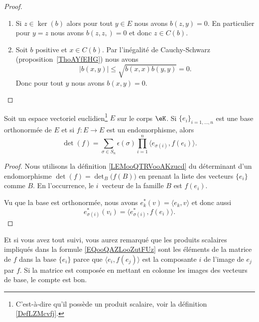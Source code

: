 \begin{proof}
    \begin{enumerate}
        \item
            Si \( z\in\ker(b)\) alors pour tout \( y\in E\) nous avons \( b(z,y)=0\). En particulier pour \( y=z\) nous avons \( b(z,z,)=0\) et donc \( z\in C(b)\).
        \item
            Soit \( b\) positive et \( x\in C(b)\). Par l'inégalité de Cauchy-Schwarz (proposition~\ref{ThoAYfEHG}) nous avons
            \begin{equation}
                | b(x,y) |\leq \sqrt{   b(x,x)b(y,y) }=0.
            \end{equation}
            Donc pour tout \( y\) nous avons \( b(x,y)=0\).
    \end{enumerate}
\end{proof}

\begin{lemma}       \label{LEMooEZFIooXyYybe}
    Soit un espace vectoriel euclidien\footnote{C'est-à-dire qu'il possède un produit scalaire, voir la définition \ref{DefLZMcvfj}.} \( E\) sur le corps \( \eK\). Si \( \{ e_i \}_{i=1,\ldots, n}\) est une base orthonormée de \( E\) et si \( f\colon E\to E\) est un endomorphisme, alors
    \begin{equation}        \label{EQooQAZLooZutFUz}
        \det(f)=\sum_{\sigma\in S_n}\epsilon(\sigma)\prod_{i=1}^n\langle e_{\sigma(i)}, f(e_i)\rangle.
    \end{equation}
\end{lemma}

\begin{proof}
    Nous utilisons la définition \ref{LEMooQTRVooAKzucd} du déterminant d'un endomorphisme \( \det(f)=\det_B\big( f(B) \big)\) en prenant la liste des vecteurs \( \{ e_i \}\) comme \( B\). En l'occurrence, le \( i\)\ieme\ vecteur de la famille \( B\) est \( f(e_i)\).

    Vu que la base est orthonormée, nous avons \( e^*_k(v)=\langle e_k, v\rangle \) et donc aussi
    \begin{equation}
        e^*_{\sigma(i)}(v_i)=\langle e_{\sigma(i)}^*, f(e_i)\rangle.
    \end{equation}
\end{proof}

Et si vous avez tout suivi, vous aurez remarqué que les produits scalaires impliqués dans la formule \eqref{EQooQAZLooZutFUz} sont les éléments de la matrice de \( f\) dans la base \( \{ e_i \}\) parce que \( \langle e_i, f(e_j)\rangle \) est la composante \( i\) de l'image de \( e_j\) par \( f\). Si la matrice est composée en mettant en colonne les images des vecteurs de base, le compte est bon.

